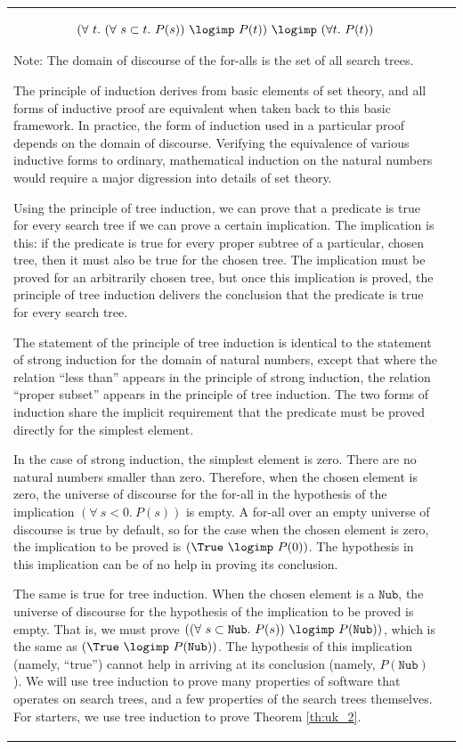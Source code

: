 \begin{tabular}{ll}
$$
  (\forall\  t.\ (\forall\  s\subset t.\  P(s))\
\logimp\  P(t))\ \logimp\  (\forall t.\  P(t))$$

Note: The domain of discourse of the for-alls is the set of all
search trees.

The principle of induction derives from basic elements of set
theory, and all forms of inductive proof are equivalent when taken
back to this basic framework. In practice, the form of induction
used in a particular proof depends on the domain of discourse.
Verifying the equivalence of various inductive forms to ordinary,
mathematical induction on the natural numbers would require a major
digression into details of set theory.



Using the principle of tree induction, we can prove that a predicate
is true for every search tree if we can prove a certain implication.
The implication is this: if the predicate is true for every proper
subtree of a particular, chosen tree, then it must also be true for
the chosen tree. The implication must be proved for an arbitrarily
chosen tree, but once this implication is proved, the principle of
tree induction delivers the conclusion that the predicate is true
for every search tree.

The statement of the principle of tree induction is identical to the
statement of strong induction for the domain of natural numbers,
except that where the relation ``less than'' appears in the
principle of strong induction, the relation ``proper subset''
appears in the principle of tree induction. The two forms of
induction share the implicit requirement that the predicate must be
proved directly for the simplest element.

In the case of strong induction, the simplest element is zero. There
are no natural numbers smaller than zero. Therefore, when the chosen
element is zero, the universe of discourse for the for-all in the
hypothesis of the implication $(\forall\ s < 0.\  P(s))$ is empty. A
for-all over an empty universe of discourse is true by default, so
for the case when the chosen element is zero, the implication to be
proved is $(\True\ \logimp\  P(0))$. The hypothesis in this
implication can be of no help in proving its conclusion.


The same is true for tree induction. When the chosen element is a
$\mathtt{Nub}$, the universe of discourse for the hypothesis of the
implication to be proved is empty. That is, we must prove
$((\forall\ s\subset \mathtt{Nub}.\  P(s))\ \logimp\
P(\mathtt{Nub}))$, which is the same as $(\True\ \logimp\
P(\mathtt{Nub}))$. The hypothesis of this implication (namely,
``true'') cannot help in arriving at its conclusion (namely,
$P(\mathtt{Nub})$). We will use tree induction to prove many
properties of software that operates on search trees, and a few
properties of the search trees themselves. For starters, we use tree
induction to prove Theorem \ref{th:uk_2}.


\end{tabular}
